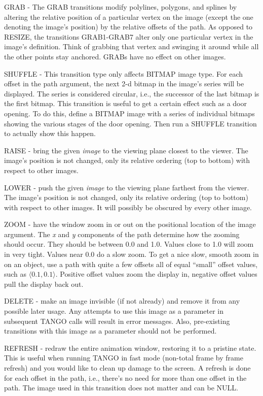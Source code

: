 GRAB - The GRAB transitions modify polylines, polygons, and splines by
altering the relative position of a particular vertex on the image (except the
one denoting the image's position) by the relative offsets of the path.  As
opposed to RESIZE, the transitions GRAB1-GRAB7 alter only one particular
vertex in the image's definition. Think of grabbing that vertex and swinging
it around while all the other points stay anchored.  GRABs have no effect on
other images.

SHUFFLE - This transition type only affects BITMAP image type.  For
each offset in the path argument, the next 2-d bitmap in the image's
series will be displayed.  The series is considered circular, i.e.,
the successor of the last bitmap is the first bitmap.  This transition
is useful to get a certain effect such as a door opening.  To do this,
define a BITMAP image with a series of individual bitmaps showing the
various stages of the door opening.  Then run a SHUFFLE transition to
actually show this happen.

RAISE - bring the given {\em image} to the viewing plane closest to the
viewer. The image's position is not changed, only its relative ordering (top
to bottom) with respect to other images.

LOWER - push the given {\em image} to the viewing plane farthest from the
viewer.  The image's position is not changed, only its relative ordering (top
to bottom) with respect to other images.  It will possibly be obscured by
every other image.

ZOOM - have the window zoom in or out on the positional location of
the image argument.  The {\em x} and {\em y} components of the path
determine how the zooming should occur.  They should be between 0.0
and 1.0.  Values close to 1.0 will zoom in very tight.  Values near
0.0 do a slow zoom.  To get a nice slow, smooth zoom in on an object,
use a path with quite a few offsets all of equal ``small'' offset
values, such as $\langle 0.1, 0.1\rangle$.  Positive offset values
zoom the display in, negative offset values pull the display back out.

DELETE - make an image invisible (if not already) and remove it from
any possible later usage.  Any attempts to use this image as a
parameter in subsequent TANGO calls will result in error messages.
Also, pre-existing transitions with this image as a parameter should
not be performed.

REFRESH - redraw the entire animation window, restoring it to a pristine
state.  This is useful when running TANGO in fast mode (non-total
frame by frame refresh) and you would like
to clean up damage to the screen.  A refresh is done for each offset in the
path, i.e., there's no need for more than one offset in the path.  The image
used in this transition does not matter and can be NULL.

